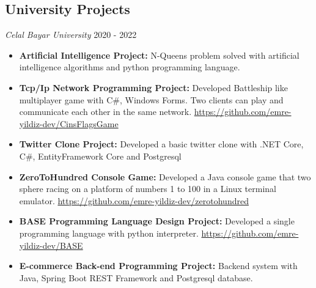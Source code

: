 \documentclass[line,margin]{res}
\begin{document}
\begin{resume}
\section{University Projects}{\sl Celal Bayar University} \hfill        2020 - 2022 \\
                  \begin{itemize}
                   \item \textbf{Artificial Intelligence Project: } N-Queens problem solved with artificial intelligence algorithms and python programming language. 
                   \item \textbf{Tcp/Ip Network Programming Project: } Developed Battleship like multiplayer game with C\#, Windows Forms. Two clients can play and communicate each other in the same network. \href{https://github.com/emre-yildiz-dev/CinsFlagsGame}{https://github.com/emre-yildiz-dev/CinsFlagsGame}
                   \item \textbf{Twitter Clone Project: } Developed a basic twitter clone with .NET Core, C\#, EntityFramework Core and Postgresql
                    \item \textbf{ZeroToHundred Console Game: } Developed a Java console game that two sphere racing on a platform of numbers 1 to 100 in a Linux terminal emulator. \href{https://github.com/emre-yildiz-dev/zerotohundred}{https://github.com/emre-yildiz-dev/zerotohundred} 
                     \item \textbf{BASE Programming Language Design Project: } Developed a single programming language with python interpreter. \href{https://github.com/emre-yildiz-dev/BASE}{https://github.com/emre-yildiz-dev/BASE}
                     \item \textbf{E-commerce Back-end Programming Project: } Backend system with Java, Spring Boot REST Framework and Postgresql database.
                      

\end{itemize}
\end{resume}
\end{document}
